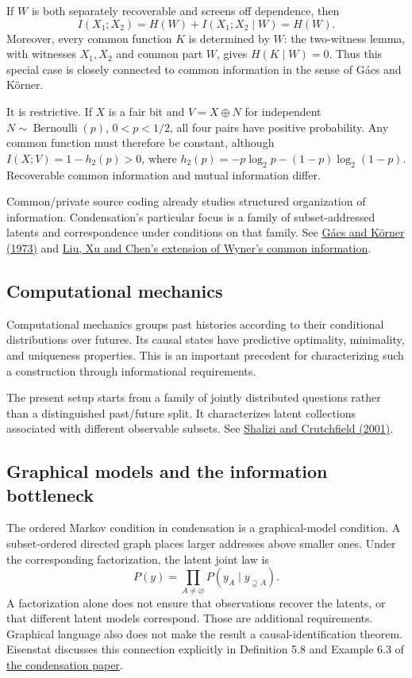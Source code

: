 \documentclass[10pt]{article}
\begin{document}
If $W$ is both separately recoverable and screens off dependence, then
\[
 I(X_1;X_2)=H(W)+I(X_1;X_2\mid W)=H(W).
\]
Moreover, every common function $K$ is determined by $W$: the two-witness lemma,
with witnesses $X_1,X_2$ and common part $W$, gives $H(K\mid W)=0$.
Thus this special case is closely connected to common information in the sense
of G\'acs and K\"orner.

It is restrictive. If $X$ is a fair bit and $V=X\mathbin{\oplus}N$ for independent
$N\sim\operatorname{Bernoulli}(p)$, $0<p<1/2$, all four pairs have positive
probability. Any common function must therefore be constant, although
$I(X;V)=1-h_2(p)>0$, where
$h_2(p)=-p\log_2 p-(1-p)\log_2(1-p)$. Recoverable common information and
mutual information differ.

Common/private source coding already studies structured organization
of information. Condensation's particular focus is a family of subset-addressed
latents and correspondence under conditions on that family.
See \href{https://cs-web.bu.edu/faculty/gacs/papers/commoninf.pdf}{G\'acs and K\"orner (1973)}
and \href{https://arxiv.org/pdf/1010.3613}{Liu, Xu and Chen's extension of Wyner's common information}.

\subsection{Computational mechanics}
Computational mechanics groups past histories according to their conditional
distributions over futures. Its causal states have predictive optimality,
minimality, and uniqueness properties. This is an important precedent for
characterizing such a construction through informational requirements.

The present setup starts from a family of jointly distributed questions rather
than a distinguished past/future split. It characterizes latent collections
associated with different observable subsets.
See \href{https://arxiv.org/abs/cond-mat/9907176}{Shalizi and Crutchfield (2001)}.

\subsection{Graphical models and the information bottleneck}
The ordered Markov condition in condensation is a graphical-model condition.
A subset-ordered directed graph places larger addresses above smaller ones.
Under the corresponding factorization, the latent joint law is
\[
 P(y)=\prod_{A\ne\varnothing}P(y_A\mid y_{\supsetneq A}).
\]
A factorization alone does not ensure that observations recover the latents,
or that different latent models correspond. Those are additional requirements.
Graphical language also does not make the result a causal-identification theorem.
Eisenstat discusses this connection explicitly in Definition 5.8 and Example 6.3
of \href{https://openreview.net/pdf?id=HwKFJ3odui}{the condensation paper}.
\end{document}
